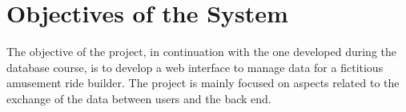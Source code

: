 \section{Objectives of the System}
The objective of the project, in continuation with the one developed during the database course, is to
develop a web interface to manage data for a fictitious amusement ride builder. The project is mainly
focused on aspects related to the exchange of the data between users and the back end.
